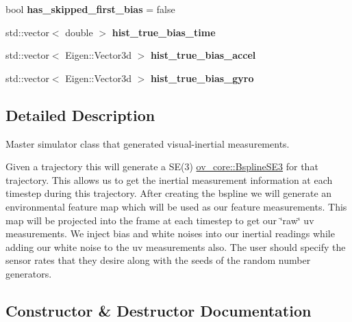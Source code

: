 \begin{DoxyCompactItemize}
\mbox{\label{classov__msckf_1_1Simulator_a91a588194049105eff55c365fd22a780}} 
bool {\bfseries has\+\_\+skipped\+\_\+first\+\_\+bias} = false
\item 
\mbox{\label{classov__msckf_1_1Simulator_a9f1e507ae501f7c579ee720c8e045ba4}} 
std\+::vector$<$ double $>$ {\bfseries hist\+\_\+true\+\_\+bias\+\_\+time}
\item 
\mbox{\label{classov__msckf_1_1Simulator_a4df35c4576725f47ad3a04def6358433}} 
std\+::vector$<$ Eigen\+::\+Vector3d $>$ {\bfseries hist\+\_\+true\+\_\+bias\+\_\+accel}
\item 
\mbox{\label{classov__msckf_1_1Simulator_a449f347bf5e1354efbfc8467454ff442}} 
std\+::vector$<$ Eigen\+::\+Vector3d $>$ {\bfseries hist\+\_\+true\+\_\+bias\+\_\+gyro}
\end{DoxyCompactItemize}


\subsection{Detailed Description}
Master simulator class that generated visual-\/inertial measurements. 

Given a trajectory this will generate a S\+E(3) \hyperlink{classov__core_1_1BsplineSE3}{ov\+\_\+core\+::\+Bspline\+S\+E3} for that trajectory. This allows us to get the inertial measurement information at each timestep during this trajectory. After creating the bspline we will generate an environmental feature map which will be used as our feature measurements. This map will be projected into the frame at each timestep to get our \char`\"{}raw\char`\"{} uv measurements. We inject bias and white noises into our inertial readings while adding our white noise to the uv measurements also. The user should specify the sensor rates that they desire along with the seeds of the random number generators. 

\subsection{Constructor \& Destructor Documentation}
\mbox{\label{classov__msckf_1_1Simulator_ab36fe774609d9e764219266867e21c4d}} 
